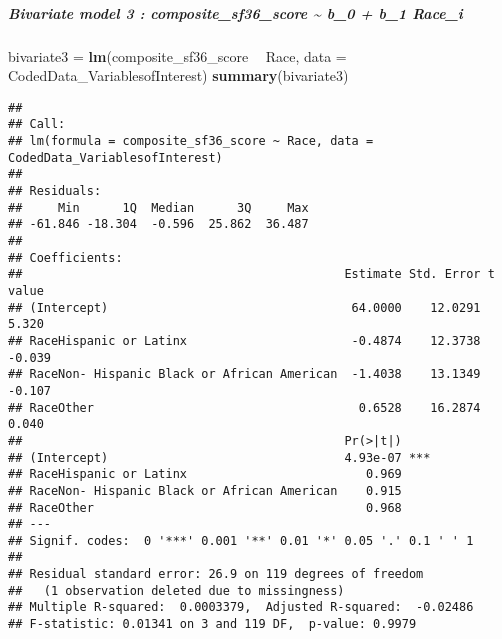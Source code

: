\documentclass[]{article}
\newenvironment{Shaded}{\begin{snugshade}}{\end{snugshade}}
\newcommand{\DataTypeTok}[1]{\textcolor[rgb]{0.13,0.29,0.53}{#1}}
\newcommand{\DecValTok}[1]{\textcolor[rgb]{0.00,0.00,0.81}{#1}}
\newcommand{\FloatTok}[1]{\textcolor[rgb]{0.00,0.00,0.81}{#1}}
\newcommand{\KeywordTok}[1]{\textcolor[rgb]{0.13,0.29,0.53}{\textbf{#1}}}
\newcommand{\NormalTok}[1]{#1}
\newcommand{\OperatorTok}[1]{\textcolor[rgb]{0.81,0.36,0.00}{\textbf{#1}}}
\newcommand{\StringTok}[1]{\textcolor[rgb]{0.31,0.60,0.02}{#1}}
\let\oldsubparagraph\subparagraph
\renewcommand{\subparagraph}[1]{\oldsubparagraph{#1}\mbox{}}
\begin{document}
\hypertarget{bivariate-model-3-composite_sf36_score-b_0-b_1-race_i}{%
\subparagraph{Bivariate model 3 : composite\_sf36\_score
\textasciitilde{} b\_0 + b\_1
Race\_i}\label{bivariate-model-3-composite_sf36_score-b_0-b_1-race_i}}

\begin{Shaded}
\begin{Highlighting}[]
\NormalTok{bivariate3 =}\StringTok{ }\KeywordTok{lm}\NormalTok{(composite_sf36_score }\OperatorTok{~}\StringTok{ }\NormalTok{Race, }\DataTypeTok{data =}\NormalTok{ CodedData_VariablesofInterest)}
\KeywordTok{summary}\NormalTok{(bivariate3)}
\end{Highlighting}
\end{Shaded}

\begin{verbatim}
## 
## Call:
## lm(formula = composite_sf36_score ~ Race, data = CodedData_VariablesofInterest)
## 
## Residuals:
##     Min      1Q  Median      3Q     Max 
## -61.846 -18.304  -0.596  25.862  36.487 
## 
## Coefficients:
##                                             Estimate Std. Error t value
## (Intercept)                                  64.0000    12.0291   5.320
## RaceHispanic or Latinx                       -0.4874    12.3738  -0.039
## RaceNon- Hispanic Black or African American  -1.4038    13.1349  -0.107
## RaceOther                                     0.6528    16.2874   0.040
##                                             Pr(>|t|)    
## (Intercept)                                 4.93e-07 ***
## RaceHispanic or Latinx                         0.969    
## RaceNon- Hispanic Black or African American    0.915    
## RaceOther                                      0.968    
## ---
## Signif. codes:  0 '***' 0.001 '**' 0.01 '*' 0.05 '.' 0.1 ' ' 1
## 
## Residual standard error: 26.9 on 119 degrees of freedom
##   (1 observation deleted due to missingness)
## Multiple R-squared:  0.0003379,  Adjusted R-squared:  -0.02486 
## F-statistic: 0.01341 on 3 and 119 DF,  p-value: 0.9979
\end{verbatim}

\begin{Shaded}
\end{Shaded}
\end{document}
